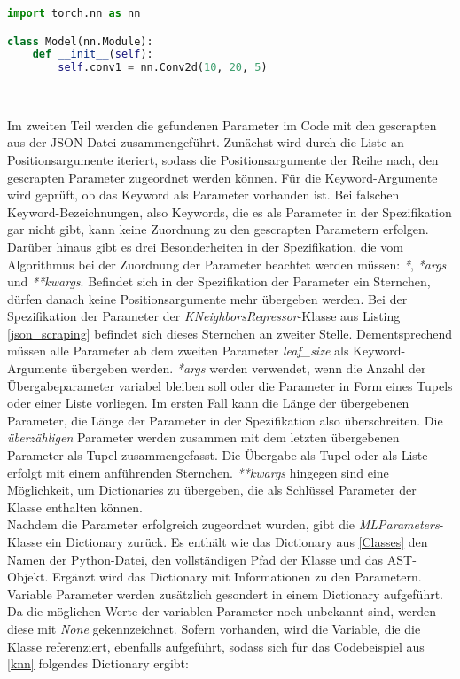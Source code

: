\documentclass[german,bachelor]{swsLeipzig}
\begin{document}
\noindent\begin{minipage}{\linewidth}
\begin{lstlisting}[language=Python, frame=single, label=nn_module,  basicstyle=\small, caption={Vererbung der ML-Klasse Module aus PyTorch},captionpos=b]
import torch.nn as nn

class Model(nn.Module):
    def __init__(self):
        self.conv1 = nn.Conv2d(10, 20, 5)
\end{lstlisting}
\end{minipage}
\

Im zweiten Teil werden die gefundenen Parameter im Code mit den gescrapten aus der JSON-Datei zusammengeführt.
Zunächst wird durch die Liste an Positionsargumente iteriert, sodass die Positionsargumente der Reihe nach,
den gescrapten Parameter zugeordnet werden können.
Für die Keyword-Argumente wird geprüft, ob das Keyword als Parameter vorhanden ist.
Bei falschen Keyword-Bezeichnungen, also Keywords, die es als Parameter in der Spezifikation gar nicht gibt,
kann keine Zuordnung zu den gescrapten Parametern erfolgen. \\
\indent Darüber hinaus gibt es drei Besonderheiten in der Spezifikation, die vom Algorithmus bei der Zuordnung der Parameter
beachtet werden müssen: \textit{*}, \textit{*args} und \textit{**kwargs}.
Befindet sich in der Spezifikation der Parameter ein Sternchen, dürfen danach keine Positionsargumente mehr
übergeben werden.
Bei der Spezifikation der Parameter der \textit{KNeighborsRegressor}-Klasse aus Listing \ref{json_scraping} befindet 
sich dieses Sternchen an zweiter Stelle.
Dementsprechend müssen alle Parameter ab dem zweiten Parameter \textit{leaf\_size} als Keyword-Argumente übergeben werden.
\textit{*args} werden verwendet, wenn die Anzahl der Übergabeparameter variabel bleiben soll oder die Parameter in Form
eines Tupels oder einer Liste vorliegen.
Im ersten Fall kann die Länge der übergebenen Parameter, die Länge der Parameter in der Spezifikation also überschreiten.
Die \textit{überzähligen} Parameter werden zusammen mit dem letzten übergebenen Parameter als Tupel zusammengefasst.
Die Übergabe als Tupel oder als Liste erfolgt mit einem anführenden Sternchen.
\textit{**kwargs} hingegen sind eine Möglichkeit, um Dictionaries zu übergeben, die als Schlüssel Parameter der Klasse
enthalten können. \\

Nachdem die Parameter erfolgreich zugeordnet wurden, gibt die \textit{MLParameters}-Klasse ein Dictionary zurück.
Es enthält wie das Dictionary aus \ref{Classes} den Namen der Python-Datei, den vollständigen Pfad der Klasse und das AST-Objekt.
Ergänzt wird das Dictionary mit Informationen zu den Parametern.
Variable Parameter werden zusätzlich gesondert in einem Dictionary aufgeführt.
Da die möglichen Werte der variablen Parameter noch unbekannt sind, werden diese mit \textit{None} gekennzeichnet.
Sofern vorhanden, wird die Variable, die die Klasse referenziert, ebenfalls aufgeführt, sodass sich für das Codebeispiel
aus \ref{knn} folgendes Dictionary ergibt:\\
\end{document}
